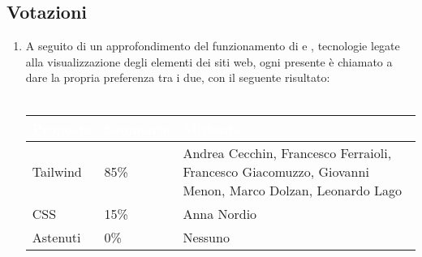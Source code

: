\subsection{Votazioni} \label{subsec:resvotazione}
\begin{enumerate}
    \item A seguito di un approfondimento del funzionamento di  e , tecnologie legate alla visualizzazione degli elementi dei siti web, ogni presente è chiamato a dare la propria preferenza tra i due, con il seguente risultato:
 \\\\
        \begingroup
            \setlength{\tabcolsep}{10pt}
            \renewcommand{\arraystretch}{1.5}
            \begin{tabularx}{0.93\textwidth}{| l | l | X |}
                 \hline
                 \rowcolor{headerrow}\textbf{\textcolor{white}{Proposta}} & \textbf{\textcolor{white}{Sommario}} & \textbf{\textcolor{white}{Mittente}} \\
                 \hline
                 Tailwind & 85\%  & Andrea Cecchin, Francesco Ferraioli, Francesco Giacomuzzo, Giovanni Menon, Marco Dolzan, Leonardo Lago \\
                 \hline
                 CSS & 15\% &  Anna Nordio\\
                 \hline
                 Astenuti & 0\% & Nessuno \\
                 \hline
            \end{tabularx}
        \endgroup
\end{enumerate}

